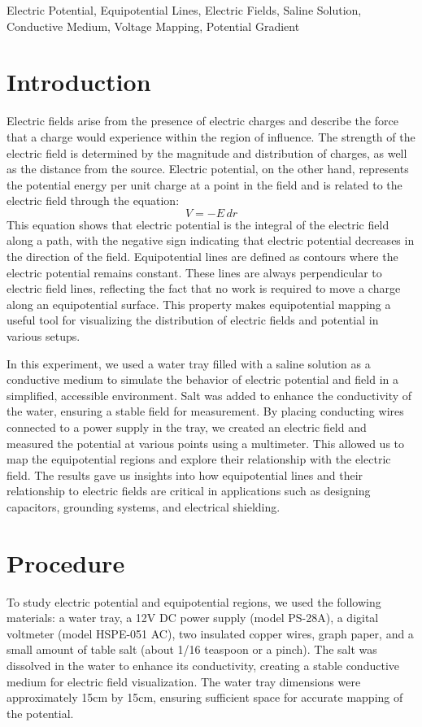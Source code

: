 \documentclass[conference]{IEEEtran}
\begin{document}
\begin{IEEEkeywords}
Electric Potential, Equipotential Lines, Electric Fields, Saline Solution, Conductive Medium, Voltage Mapping, Potential Gradient
\end{IEEEkeywords}

\section{Introduction}
Electric fields arise from the presence of electric charges and describe the force that a charge would experience within the region of influence. The strength of the electric field is determined by the magnitude and distribution of charges, as well as the distance from the source. Electric potential, on the other hand, represents the potential energy per unit charge at a point in the field and is related to the electric field through the equation:
\begin{equation}
V = -E \, dr
\end{equation}
This equation shows that electric potential is the integral of the electric field along a path, with the negative sign indicating that electric potential decreases in the direction of the field. Equipotential lines are defined as contours where the electric potential remains constant. These lines are always perpendicular to electric field lines, reflecting the fact that no work is required to move a charge along an equipotential surface. This property makes equipotential mapping a useful tool for visualizing the distribution of electric fields and potential in various setups.

In this experiment, we used a water tray filled with a saline solution as a conductive medium to simulate the behavior of electric potential and field in a simplified, accessible environment. Salt was added to enhance the conductivity of the water, ensuring a stable field for measurement. By placing conducting wires connected to a power supply in the tray, we created an electric field and measured the potential at various points using a multimeter. This allowed us to map the equipotential regions and explore their relationship with the electric field. The results gave us insights into how equipotential lines and their relationship to electric fields are critical in applications such as designing capacitors, grounding systems, and electrical shielding.

\section{Procedure}
To study electric potential and equipotential regions, we used the following materials: a water tray, a 12V DC power supply (model PS-28A), a digital voltmeter (model HSPE-051 AC), two insulated copper wires, graph paper, and a small amount of table salt (about 1/16 teaspoon or a pinch). The salt was dissolved in the water to enhance its conductivity, creating a stable conductive medium for electric field visualization. The water tray dimensions were approximately 15cm by 15cm, ensuring sufficient space for accurate mapping of the potential.
\end{document}

